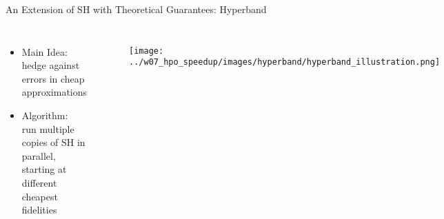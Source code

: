 

\begin{frame}{An Extension of SH with Theoretical Guarantees: Hyperband}
    
\vskip -10pt
\hskip 330pt
    
\begin{columns}

    \begin{itemize}
        \item Main Idea: \\ hedge against errors in cheap approximations
        \item Algorithm: \\ run multiple copies of SH in parallel, starting at different cheapest fidelities
    \end{itemize}
    
    \vskip -20pt
    \begin{figure}
        \centering
        \texttt{[image: ../w07\_hpo\_speedup/images/hyperband/hyperband\_illustration.png]}
    \end{figure}

\end{columns}
    
\end{frame}

